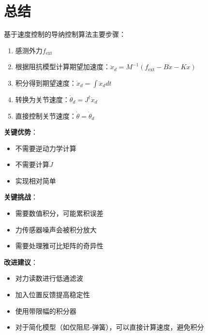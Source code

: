 \documentclass[12pt,a4paper]{article}
\begin{document}
\section{总结}

基于速度控制的导纳控制算法主要步骤：

\begin{enumerate}
\item 感测外力$f_{\text{ext}}$
\item 根据阻抗模型计算期望加速度：$\ddot{x}_d = M^{-1}(f_{\text{ext}} - B\dot{x} - Kx)$
\item 积分得到期望速度：$\dot{x}_d = \int \ddot{x}_d dt$
\item 转换为关节速度：$\dot{\theta}_d = J^{\dagger}\dot{x}_d$
\item 直接控制关节速度：$\dot{\theta} = \dot{\theta}_d$
\end{enumerate}

\textbf{关键优势}：
\begin{itemize}
\item 不需要逆动力学计算
\item 不需要计算$\dot{J}$
\item 实现相对简单
\end{itemize}

\textbf{关键挑战}：
\begin{itemize}
\item 需要数值积分，可能累积误差
\item 力传感器噪声会被积分放大
\item 需要处理雅可比矩阵的奇异性
\end{itemize}

\textbf{改进建议}：
\begin{itemize}
\item 对力读数进行低通滤波
\item 加入位置反馈提高稳定性
\item 使用带限幅的积分器
\item 对于简化模型（如仅阻尼-弹簧），可以直接计算速度，避免积分
\end{itemize}
\end{document}
